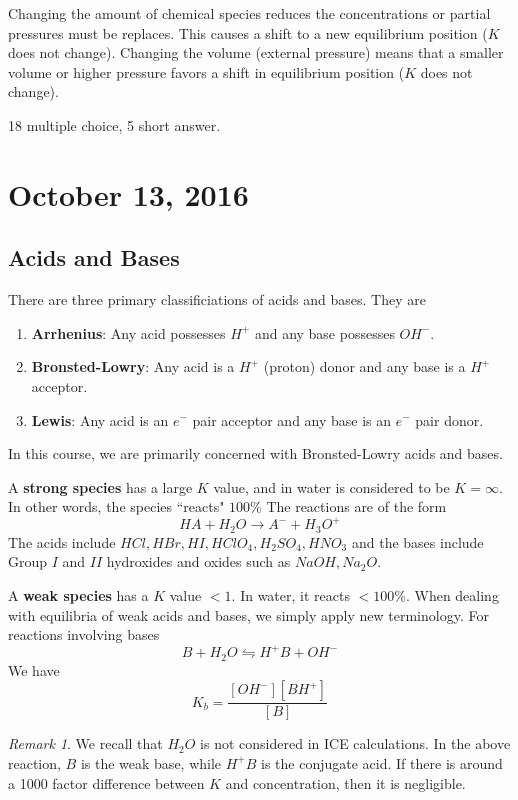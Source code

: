 \documentclass[11pt]{article}
\theoremstyle{plain} %
\theoremstyle{definition}
\theoremstyle{example}
\theoremstyle{remark}
\newtheorem*{remark}{Remark}
\begin{document}
Changing the amount of chemical species reduces the concentrations or partial pressures must be replaces. This causes a shift to a new equilibrium position ($K$ does not change).
Changing the volume (external pressure) means that a smaller volume or higher pressure favors a shift in equilibrium position ($K$ does not change). 







18 multiple choice, 5 short answer.

\section{October 13, 2016}
\subsection{Acids and Bases}

There are three primary classificiations of acids and bases. They are
\begin{enumerate}
\item \textbf{Arrhenius}: Any acid possesses $H^+$ and any base possesses $OH^-$.
\item \textbf{Bronsted-Lowry}: Any acid is a $H^+$ (proton) donor and any base is a $H^+$ acceptor.
\item \textbf{Lewis}: Any acid is an $e^-$ pair acceptor and any base is an $e^-$ pair donor. 
\end{enumerate}
In this course, we are primarily concerned with Bronsted-Lowry acids and bases.

A \textbf{strong species} has a large $K$ value, and in water is considered to be $K = \infty$. In other words, the species ``reacts" $100\%$ The reactions are of the form $$HA + H_2O \rightarrow A^- + H_3O^+$$ The acids include $HCl, HBr, HI, HClO_4, H_2SO_4, HNO_3$ and the bases include Group $I$ and $II$ hydroxides and oxides such as $NaOH, Na_2O$. 

A \textbf{weak species} has a $K$ value $< 1$. In water, it reacts $< 100\%$. When dealing with equilibria of weak acids and bases, we simply apply new terminology. For reactions involving bases
$$B +H_2O \leftrightharpoons H^+B + OH^-$$We have $$K_b = \frac{[OH^-][BH^+]}{[B]}$$

\begin{remark}
We recall that $H_2O$ is not considered in ICE calculations. In the above reaction, $B$ is the weak base, while $H^+B$ is the conjugate acid. If there is around a 1000 factor difference between $K$ and concentration, then it is negligible.
\end{remark}
\end{document}
